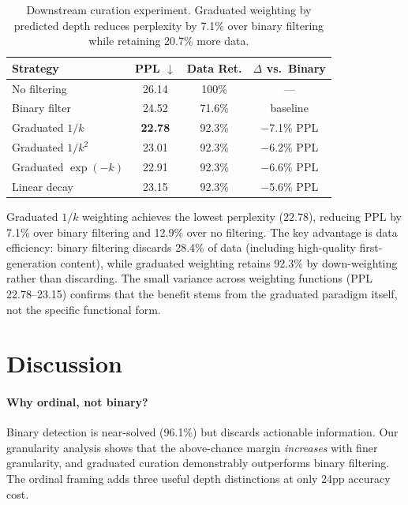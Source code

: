 \documentclass[11pt,a4paper]{article}
\begin{document}
\begin{table}[t]
\centering
\small
\begin{tabular}{lccc}
\toprule
\textbf{Strategy} & \textbf{PPL $\downarrow$} & \textbf{Data Ret.} & \textbf{$\Delta$ vs.\ Binary} \\
\midrule
No filtering        & 26.14 & 100\%  & --- \\
Binary filter       & 24.52 & 71.6\% & baseline \\
Graduated $1/k$     & \textbf{22.78} & 92.3\% & $-$7.1\% PPL \\
Graduated $1/k^2$   & 23.01 & 92.3\% & $-$6.2\% PPL \\
Graduated $\exp(-k)$& 22.91 & 92.3\% & $-$6.6\% PPL \\
Linear decay        & 23.15 & 92.3\% & $-$5.6\% PPL \\
\bottomrule
\end{tabular}
\caption{Downstream curation experiment. Graduated weighting by predicted depth reduces perplexity by 7.1\% over binary filtering while retaining 20.7\% more data.}
\label{tab:curation}
\end{table}

Graduated $1/k$ weighting achieves the lowest perplexity (22.78), reducing PPL by 7.1\% over binary filtering and 12.9\% over no filtering. The key advantage is data efficiency: binary filtering discards 28.4\% of data (including high-quality first-generation content), while graduated weighting retains 92.3\% by down-weighting rather than discarding. The small variance across weighting functions (PPL 22.78--23.15) confirms that the benefit stems from the graduated paradigm itself, not the specific functional form.

\section{Discussion}

\paragraph{Why ordinal, not binary?}
Binary detection is near-solved (96.1\%) but discards actionable information. Our granularity analysis shows that the above-chance margin \emph{increases} with finer granularity, and graduated curation demonstrably outperforms binary filtering. The ordinal framing adds three useful depth distinctions at only 24pp accuracy cost.
\end{document}
